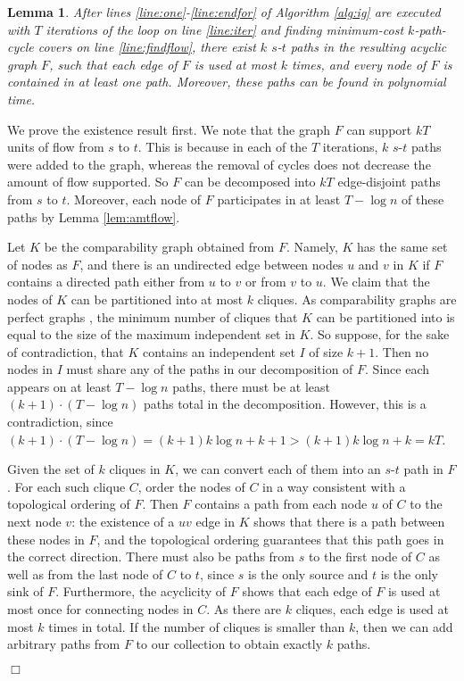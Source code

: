 \documentclass[11pt]{article}
\newcommand{\qed}{\hspace*{\fill}$\Box$}
\newtheorem{lemma}[theorem]{Lemma}
\newenvironment{proof}[1][Proof. ]{\noindent {\bf #1 }}{\qed}
\begin{document}
\begin{lemma} \label{lem:kpaths}
After lines \ref{line:one}-\ref{line:endfor} of Algorithm \ref{alg:ig} are executed with $T$ iterations of the 
loop on line \ref{line:iter} and finding minimum-cost $k$-path-cycle covers on line \ref{line:findflow}, there 
exist $k$ $s$-$t$ paths in the resulting acyclic graph $F$, such that each edge of $F$ is used at most $k$ times, 
and every node of $F$ is contained in at least one path. Moreover, these paths can be found in polynomial time.
\end{lemma}
\begin{proof}
We prove the existence result first. 
We note that the graph $F$ can support $kT$ units of flow from $s$ to $t$. This is because in each of the $T$ 
iterations, $k$ $s$-$t$ paths were added to the graph, whereas the removal of cycles does not decrease the 
amount of flow supported. So $F$ can be decomposed into $kT$ edge-disjoint paths from $s$ to $t$. Moreover,
 each node of $F$ participates in at least $T-\log n$ of these paths by Lemma \ref{lem:amtflow}.

Let $K$ be the comparability graph obtained from $F$. Namely, $K$ has the same set of nodes as $F$, and there
 is an undirected edge between nodes $u$ and $v$ in $K$ if $F$ contains a directed path either from $u$ to $v$
 or from $v$ to $u$. We claim that the nodes of $K$ can be partitioned into at most $k$ cliques. As comparability
 graphs are perfect graphs \cite{golumbic}, the minimum number of cliques that $K$ can be partitioned into is
 equal to the size of the maximum independent set in $K$. So suppose, for the sake of contradiction, that $K$ 
contains an independent set $I$ of size $k+1$. Then no nodes in $I$ must share any of the paths in our decomposition
 of $F$. Since each appears on at least $T-\log n$ paths, there must be at least $(k+1) \cdot (T-\log n)$ paths total 
in the decomposition. However, this is a contradiction, 
since $(k+1) \cdot (T-\log n) = (k+1)k \log n +k +1 > (k+1)k \log n +k = kT$.

Given the set of $k$ cliques in $K$, we can convert each of them into an $s$-$t$ path in $F$. For each
 such clique $C$, order the nodes of $C$ in a way consistent with a topological ordering of $F$. Then
 $F$ contains a path from each node $u$ of $C$ to the next node $v$: the existence of a $uv$ edge in $K$
 shows that there is a path between these nodes in $F$, and the topological ordering guarantees that this
 path goes in the correct direction. There must also be paths from $s$ to the first node of $C$ as well as
 from the last node of $C$ to $t$, since $s$ is the only source and $t$ is the only sink of $F$. Furthermore,
 the acyclicity of $F$ shows that each edge of $F$ is used at most once for connecting nodes in $C$. As there
 are $k$ cliques, each edge is used at most $k$ times in total. If the number of cliques is smaller than $k$,
 then we can add arbitrary paths from $F$ to our collection to obtain exactly $k$ paths. 


\end{proof}
\end{document}
